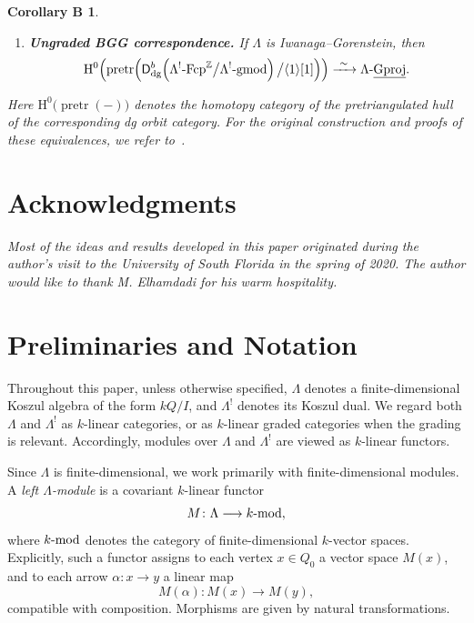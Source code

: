 \documentclass[11pt]{article}
\newtheorem*{corollaryB}{\textbf{Corollary B}}
\theoremstyle{definition}
\theoremstyle{remark}
\begin{document}
\begin{corollaryB}
\begin{enumerate}
\item \textbf{Ungraded BGG correspondence.}
If \(\Lambda\) is Iwanaga--Gorenstein, then
\[
\mathrm{H}^{0}\!\left(
\operatorname{pretr}\!\left(
\mathsf{D}_{\mathrm{dg}}^{b}\!\left(
\Lambda^{!}\textup{-}\mathrm{Fcp}^{\mathbb{Z}}
\big/
\Lambda^{!}\textup{-}\mathrm{gmod}
\right)
\big/
\langle 1\rangle[1]
\right)
\right)
\xrightarrow{\ \sim\ }
\Lambda\textup{-}\underline{\operatorname{Gproj}}.
\]

\end{enumerate}

Here
\(\mathrm{H}^{0}\!\bigl(\operatorname{pretr}(-)\bigr)\)
denotes the homotopy category of the pretriangulated hull of the corresponding dg orbit category. For the original construction and proofs of these equivalences, we refer to~\cite{4}.
\section*{Acknowledgments}

Most of the ideas and results developed in this paper originated during the author's visit to the University of South Florida in the spring of 2020. The author would like to thank M. Elhamdadi for his warm hospitality.
\end{corollaryB}

\section{Preliminaries and Notation}
Throughout this paper, unless otherwise specified, $\Lambda$ denotes a finite-dimensional Koszul algebra of the form $kQ/I$, and $\Lambda^{!}$ denotes its Koszul dual. We regard both $\Lambda$ and $\Lambda^{!}$ as $k$-linear categories, or as $k$-linear graded categories when the grading is relevant. Accordingly, modules over $\Lambda$ and $\Lambda^{!}$ are viewed as $k$-linear functors.

\medskip

Since \(\Lambda\) is finite-dimensional, we work primarily with finite-dimensional modules. A \emph{left \(\Lambda\)-module} is a covariant \(k\)-linear functor
\[
M \colon \Lambda \longrightarrow k\textup{-mod},
\]
where \(k\textup{-mod}\) denotes the category of finite-dimensional \(k\)-vector spaces. Explicitly, such a functor assigns to each vertex \(x \in Q_0\) a vector space \(M(x)\), and to each arrow \(\alpha\colon x\to y\) a linear map
\[
M(\alpha)\colon M(x)\longrightarrow M(y),
\]
compatible with composition. Morphisms are given by natural transformations.
\end{document}
